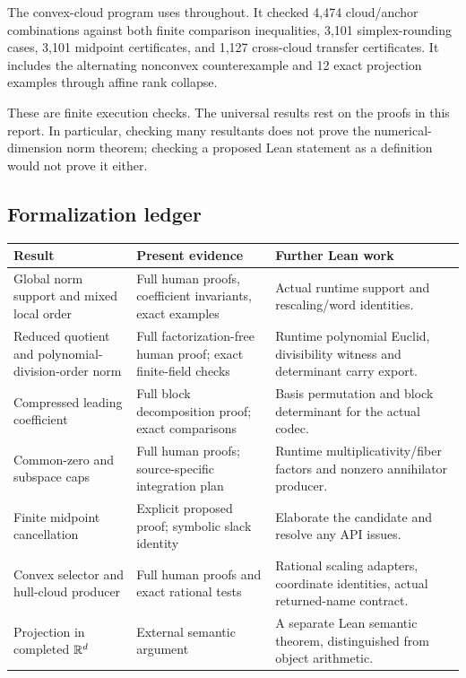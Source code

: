 The convex-cloud program uses  throughout. It checked 4,474 cloud/anchor combinations against both finite comparison inequalities, 3,101 simplex-rounding cases, 3,101 midpoint certificates, and 1,127 cross-cloud transfer certificates. It includes the alternating nonconvex counterexample and 12 exact projection examples through affine rank collapse.

These are finite execution checks. The universal results rest on the proofs in this report. In particular, checking many resultants does not prove the numerical-dimension norm theorem; checking a proposed Lean statement as a definition would not prove it either.

\subsection{Formalization ledger}

\begin{longtable}{@{}P{0.33\textwidth}P{0.27\textwidth}P{0.34\textwidth}@{}}
\toprule
Result & Present evidence & Further Lean work\\
\midrule
\endhead
Global norm support and mixed local order & Full human proofs, coefficient invariants, exact examples & Actual runtime support and rescaling/word identities.\\[4pt]
Reduced quotient and polynomial-division-order norm & Full factorization-free human proof; exact finite-field checks & Runtime polynomial Euclid, divisibility witness and determinant carry export.\\[4pt]
Compressed leading coefficient & Full block decomposition proof; exact comparisons & Basis permutation and block determinant for the actual codec.\\[4pt]
Common-zero and subspace caps & Full human proofs; source-specific integration plan & Runtime multiplicativity/fiber factors and nonzero annihilator producer.\\[4pt]
Finite midpoint cancellation & Explicit proposed  proof; symbolic slack identity & Elaborate the candidate and resolve any API issues.\\[4pt]
Convex selector and hull-cloud producer & Full human proofs and exact rational tests & Rational scaling adapters, coordinate identities, actual returned-name contract.\\[4pt]
Projection in completed $\mathbb R^d$ & External semantic argument & A separate Lean semantic theorem, distinguished from object arithmetic.\\
\bottomrule
\end{longtable}

